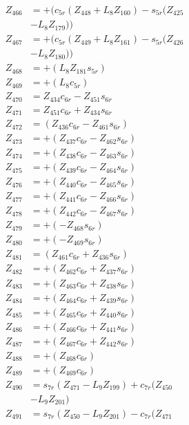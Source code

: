 \begin{multicols}{2}
\begin{align}
Z_{466} &= + (c_{5r}(Z_{448} + L_8Z_{160}) - s_{5r}(Z_{425}  \nonumber \\
&- L_8Z_{179})) \nonumber \\
Z_{467} &= + (c_{5r}(Z_{449} + L_8Z_{161}) - s_{5r}(Z_{426}  \nonumber \\
&- L_8Z_{180})) \nonumber \\
Z_{468} &= + (L_8Z_{181}s_{5r}) \nonumber \\
Z_{469} &= + (L_8c_{5r}) \nonumber \\
Z_{470} &= Z_{434}c_{6r} - Z_{451}s_{6r} \nonumber \\
Z_{471} &= Z_{451}c_{6r} + Z_{434}s_{6r} \nonumber \\
Z_{472} &= (Z_{436}c_{6r} - Z_{461}s_{6r}) \nonumber \\
Z_{473} &= + (Z_{437}c_{6r} - Z_{462}s_{6r}) \nonumber \\
Z_{474} &= + (Z_{438}c_{6r} - Z_{463}s_{6r}) \nonumber \\
Z_{475} &= + (Z_{439}c_{6r} - Z_{464}s_{6r}) \nonumber \\
Z_{476} &= + (Z_{440}c_{6r} - Z_{465}s_{6r}) \nonumber \\
Z_{477} &= + (Z_{441}c_{6r} - Z_{466}s_{6r}) \nonumber \\
Z_{478} &= + (Z_{442}c_{6r} - Z_{467}s_{6r}) \nonumber \\
Z_{479} &= + (-Z_{468}s_{6r}) \nonumber \\
Z_{480} &= + (-Z_{469}s_{6r}) \nonumber \\
Z_{481} &= (Z_{461}c_{6r} + Z_{436}s_{6r}) \nonumber \\
Z_{482} &= + (Z_{462}c_{6r} + Z_{437}s_{6r}) \nonumber \\
Z_{483} &= + (Z_{463}c_{6r} + Z_{438}s_{6r}) \nonumber \\
Z_{484} &= + (Z_{464}c_{6r} + Z_{439}s_{6r}) \nonumber \\
Z_{485} &= + (Z_{465}c_{6r} + Z_{440}s_{6r}) \nonumber \\
Z_{486} &= + (Z_{466}c_{6r} + Z_{441}s_{6r}) \nonumber \\
Z_{487} &= + (Z_{467}c_{6r} + Z_{442}s_{6r}) \nonumber \\
Z_{488} &= + (Z_{468}c_{6r}) \nonumber \\
Z_{489} &= + (Z_{469}c_{6r}) \nonumber \\
Z_{490} &= s_{7r}(Z_{471} - L_9Z_{199}) + c_{7r}(Z_{450}  \nonumber \\
&- L_9Z_{201}) \nonumber \\
Z_{491} &= s_{7r}(Z_{450} - L_9Z_{201}) - c_{7r}(Z_{471}  \nonumber \\

\end{align}
\end{multicols}
